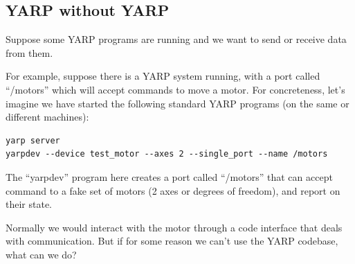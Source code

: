 


\subsection{YARP without YARP}

Suppose some YARP programs are running and we want to send or
receive data from them.

For example, suppose there is a YARP system running, with a 
port called ``/motors'' which will accept commands to move a
motor.  For concreteness, let's imagine we have started the
following standard YARP programs (on the same or different 
machines):

\begin{verbatim}
yarp server
yarpdev --device test_motor --axes 2 --single_port --name /motors
\end{verbatim}

The ``yarpdev'' program here creates a port called ``/motors'' that can
accept command to a fake set of motors (2 axes or degrees of freedom),
and report on their state.

Normally we would interact with the motor through a code
interface that deals with communication.  But if for 
some reason we can't use the YARP codebase, what can
we do?

